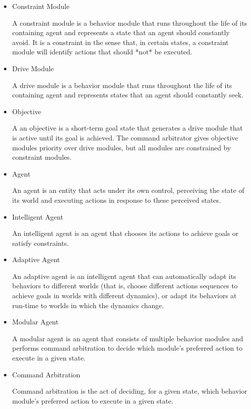 \begin{itemize}
\item Constraint Module

  A constraint module is a behavior module that runs throughout the
  life of its containing agent and represents a state that an agent
  should constantly avoid.  It is a constraint in the sense that, in
  certain states, a constraint module will identify actions that should
  *not* be executed.

\item Drive Module

  A drive module is a behavior module that runs throughout the
  life of its containing agent and represents states that an agent
  should constantly seek.

\item Objective

  A an objective is a short-term goal state that generates a drive
  module that is active until its goal is achieved.  The command
  arbitrator gives objective modules priority over drive modules, but
  all modules are constrained by constraint modules.

\item Agent

  An agent is an entity that acts under its own control, perceiving
  the state of its world and executing actions in response to these
  perceived states.

\item Intelligent Agent

  An intelligent agent is an agent that chooses its actions to achieve
  goals or satisfy constraints.

\item Adaptive Agent

  An adaptive agent is an intelligent agent that can automatically
  adapt its behaviors to different worlds (that is, choose different
  actions sequences to achieve goals in worlds with different
  dynamics), or adapt its behaviors at run-time to worlds in which the
  dynamics change.

\item Modular Agent

  A modular agent is an agent that consists of multiple behavior
  modules and performs command arbitration to decide which module's
  preferred action to execute in a given state.

\item Command Arbitration

  Command arbitration is the act of deciding, for a given state, which
  behavior module's preferred action to execute in a given state.
\end{itemize}

